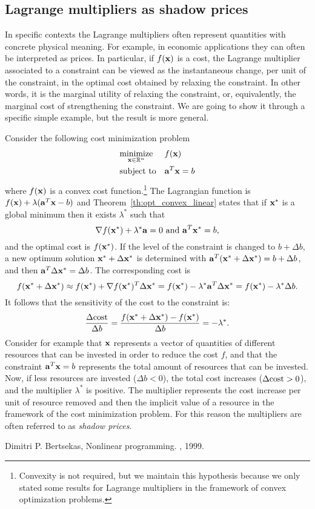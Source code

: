 \subsection{Lagrange multipliers as shadow prices}
In specific contexts the Lagrange multipliers often represent quantities with concrete physical meaning. For example, in economic applications they can often be interpreted as prices. In particular, if $f(\mathbf{x})$ is a cost, the Lagrange multiplier associated to a constraint can be viewed as the instantaneous change, per unit of the constraint, in the optimal cost obtained by relaxing the constraint. In other words, it is the marginal utility of relaxing the constraint, or, equivalently, the marginal cost of strengthening the constraint. We are going to show it through a specific simple example, but the result is more general.

\begin{example}
Consider the following cost minimization problem
\begin{equation*}
\begin{aligned}
& \underset{\mathbf{x} \in \mathbb{R}^n}{\textnormal{minimize}}
	& & f(\mathbf{x}) \\
& \textnormal{subject to}
      & &  \mathbf{a}^T \mathbf{x}=b
\end{aligned}
\end{equation*}
where $f(\mathbf{x})$ is a convex cost function.\footnote{
	Convexity is not required, but we maintain this hypothesis 
	because we only stated some results for Lagrange multipliers 
	in the framework of convex optimization problems.
}
The Lagrangian function is $f(\mathbf{x})+\lambda(\mathbf{a}^T \mathbf{x} - b)$ and 
Theorem~\ref{th:opt_convex_linear} states that if $\mathbf{x}^*$ is a global minimum then it exists $\lambda^*$ such that
\[
	\nabla f(\mathbf{x}^*) + \lambda^*\mathbf{a}=0 \text{ and } \mathbf{a}^T \mathbf{x}^* =b, 
\]
and the optimal cost is $f(\mathbf{x}^*)$.
If the level of the constraint is changed to $b+\Delta b$, a new optimum solution $\mathbf{x}^* + \Delta \mathbf{x}^*$ is determined with $\mathbf{a}^T (\mathbf{x}^*+\Delta \mathbf{x}^*) = b+ \Delta b$, and then  $\mathbf{a}^T \Delta \mathbf{x}^* = \Delta b$. The corresponding cost is 
\[
	f(\mathbf{x}^* + \Delta \mathbf{x}^*) \approx f(\mathbf{x}^*)+ \nabla f(\mathbf{x}^*)^T \Delta \mathbf{x}^* = f(\mathbf{x}^*) -\lambda^* \mathbf{a}^T \Delta \mathbf{x}^* =  f(\mathbf{x}^*) -\lambda^*  \Delta b.
\]
It follows that the sensitivity of the cost to the constraint is:
\[
	\frac{\Delta \textnormal{cost}}{\Delta b}= \frac{f(\mathbf{x}^* +\Delta \mathbf{x}^*) - f(\mathbf{x}^*)}{\Delta b} = -\lambda^*. 
\]
Consider for example that $\mathbf{x}$ represents a vector of quantities of different resources that can be invested in order to reduce the cost $f$, and that the constraint $\mathbf{a}^T \mathbf{x}=b$ represents the total amount of resources that can be invested. Now, if less resources are invested ($\Delta b <0$), the total cost increases ($\Delta \textnormal{cost}>0$), and the multiplier $\lambda^*$ is positive. The multiplier represents the cost increase per  unit of resource removed and then the implicit value of a resource in the framework of the cost minimization problem. For this reason the multipliers are often referred to as \emph{shadow prices}.
\end{example}

\begin{thebibliography}{alpha}

 Dimitri P. Bertsekas,
\newblock Nonlinear programming.
, 1999.

\end{thebibliography}



